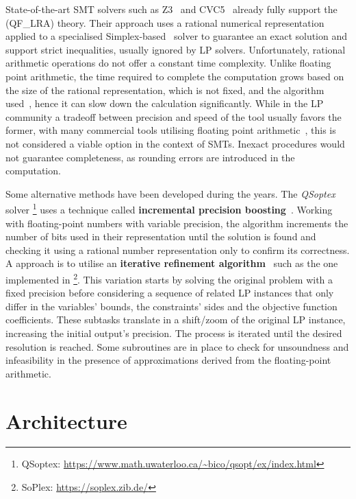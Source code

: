 \documentclass[runningheads]{llncs}
\begin{document}
State-of-the-art SMT solvers such as Z3~\cite{ref:z3} and CVC5~\cite{ref:cvc5} already fully support the (QF\_LRA) theory.
Their approach uses a rational numerical representation applied to a specialised Simplex-based~\cite{ref:simplex} solver to guarantee an exact solution and support strict inequalities, usually ignored by LP solvers.
Unfortunately, rational arithmetic operations do not offer a constant time complexity. %
Unlike floating point arithmetic, the time required to complete the computation grows based on the size of the rational representation, which is not fixed, and the algorithm used~\cite{ref:fft-mult}, hence it can slow down the calculation significantly.
While in the LP community a tradeoff between precision and speed of the tool usually favors the former, with many commercial tools utilising floating point arithmetic~\cite{ref:gurobi}, this is not considered a viable option in the context of SMTs.
Inexact procedures would not guarantee completeness, as rounding errors are introduced in the computation.

Some alternative methods have been developed during the years.
The \textit{QSoptex} solver \footnote{QSoptex: \url{https://www.math.uwaterloo.ca/~bico/qsopt/ex/index.html}} uses a technique called \textbf{incremental precision boosting}~\cite{ref:precision-boosting}.
Working with floating-point numbers with variable precision, the algorithm increments the number of bits used in their representation until the solution is found and checking it using a rational number representation only to confirm its correctness.
A approach is to utilise an \textbf{iterative refinement algorithm}~\cite{ref:iterative-refinement} such as the one implemented in \soplex \footnote{SoPlex: \url{https://soplex.zib.de/}}.
This variation starts by solving the original problem with a fixed precision before considering a sequence of related LP instances that only differ in the variables' bounds, the constraints' sides and the objective function coefficients.
These subtasks translate in a shift/zoom of the original LP instance, increasing the initial output's precision.
The process is iterated until the desired resolution is reached.
Some subroutines are in place to check for unsoundness and infeasibility in the presence of approximations derived from the floating-point arithmetic.

\section{Architecture}
\end{document}
